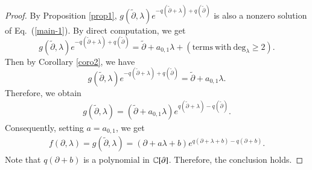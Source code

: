 \documentclass[12pt]{amsart}
\begin{document}
\begin{proof}
By Proposition \ref{prop1}, $g(\widetilde{\partial}, \lambda)e^{-q(\widetilde{\partial}+\lambda)+q(\widetilde{\partial})}$ is also a nonzero solution of Eq.~(\ref{main-1}).
By direct computation, we get
$$g(\widetilde{\partial}, \lambda)e^{-q(\widetilde{\partial}+\lambda)+q(\widetilde{\partial})}=\widetilde{\partial}+a_{0,1}\lambda+(\text{terms}\ \text{with}\ \text{deg}_\lambda\geq2).$$
Then by Corollary \ref{coro2}, we have $$g(\widetilde{\partial}, \lambda)e^{-q(\widetilde{\partial}+\lambda)+q(\widetilde{\partial})}=\widetilde{\partial}+a_{0,1}\lambda.$$
Therefore, we obtain
\begin{eqnarray*}
g(\widetilde{\partial}, \lambda)=(\widetilde{\partial}+a_{0,1}\lambda)e^{q(\widetilde{\partial}+\lambda)-q(\widetilde{\partial})}.
\end{eqnarray*}
Consequently, setting $a=a_{0, 1}$, we get
\begin{eqnarray*}
f(\partial, \lambda)=g(\widetilde{\partial}, \lambda)=(\partial+a\lambda+b)e^{q(\partial+\lambda+b)-q(\partial+b)}.
\end{eqnarray*}
Note that $q(\partial+b)$ is a polynomial in $\mathbb{C}[\partial]$. Therefore, the conclusion holds.
\end{proof}
\end{document}
